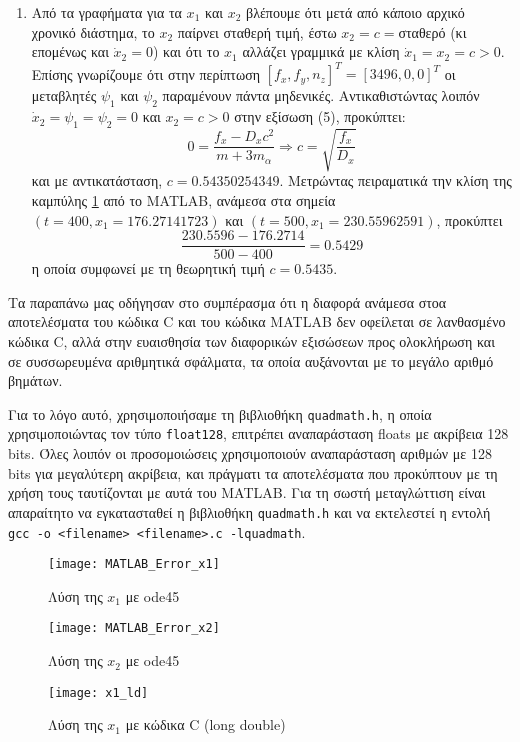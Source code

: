 \documentclass{article}
\begin{document}
\begin{appendices}
\begin{enumerate}
	\item Από τα γραφήματα για τα \(x_1\) και \(x_2\) βλέπουμε ότι μετά από κάποιο αρχικό χρονικό διάστημα, το \(x_2\) παίρνει σταθερή τιμή, έστω \(x_2=c=\)σταθερό (κι επομένως και \(\dot{x}_2=0\)) και ότι το \(x_1\) αλλάζει γραμμικά με κλίση \(\dot{x}_1=x_2=c>0\). Επίσης γνωρίζουμε ότι στην περίπτωση \([f_x, f_y, n_z]^T = [3496, 0, 0]^T\) οι μεταβλητές \(\psi_1\) και \(\psi_2\) παραμένουν πάντα μηδενικές. Αντικαθιστώντας λοιπόν \(\dot{x}_2=\psi_1=\psi_2=0\) και \(x_2=c>0\) στην εξίσωση (5), προκύπτει:
	\[0=\frac{f_x-D_xc^2}{m+3m_{\alpha}}\Rightarrow c=\sqrt{\frac{f_x}{D_x}}\]
	και με αντικατάσταση, \(c=0.54350254349\). Μετρώντας πειραματικά την κλίση της καμπύλης \ref{l_33} από το MATLAB, ανάμεσα στα σημεία \((t=400,x_1=176.27141723)\) και \((t=500,x_1=230.55962591)\), προκύπτει 
	\[\frac{230.5596-176.2714}{500-400}=0.5429\]
η οποία συμφωνεί με τη θεωρητική τιμή \(c=0.5435\).
\end{enumerate}
Τα παραπάνω μας οδήγησαν στο συμπέρασμα ότι η διαφορά ανάμεσα στοα αποτελέσματα του κώδικα C και του κώδικα MATLAB δεν οφείλεται σε λανθασμένο κώδικα C, αλλά στην ευαισθησία των διαφορικών εξισώσεων προς ολοκλήρωση και σε συσσωρευμένα αριθμητικά σφάλματα, τα οποία αυξάνονται με το μεγάλο αριθμό βημάτων.

Για το λόγο αυτό, χρησιμοποιήσαμε τη βιβλιοθήκη \texttt{quadmath.h}, η οποία χρησιμοποιώντας τον τύπο \texttt{\textunderscore float128}, επιτρέπει αναπαράσταση floats με ακρίβεια 128 bits. Όλες λοιπόν οι προσομοιώσεις χρησιμοποιούν αναπαράσταση αριθμών με 128 bits για μεγαλύτερη ακρίβεια, και πράγματι τα αποτελέσματα που προκύπτουν με τη χρήση τους ταυτίζονται με αυτά του MATLAB. Για τη σωστή μεταγλώττιση είναι απαραίτητο να εγκατασταθεί η βιβλιοθήκη \texttt{quadmath.h} και να εκτελεστεί η εντολή \texttt{gcc -o <filename> <filename>.c -lquadmath}.
\end{appendices}
\clearpage

\begin{figure}[hb]
 \centering
\texttt{[image: MATLAB\_Error\_x1]}
\caption{Λύση της \(x_1\) με ode45}
\label{l_33}
\end{figure}

\begin{figure}[hb]
 \centering
\texttt{[image: MATLAB\_Error\_x2]}
\caption{Λύση της \(x_2\) με ode45}
\label{l_34}
\end{figure}
\clearpage

\begin{figure}[hb]
 \centering
\texttt{[image: x1\_ld]}
\caption{Λύση της \(x_1\) με κώδικα C (long double)}
\label{l_37}
\end{figure}
\end{document}
